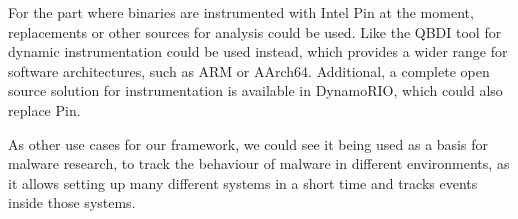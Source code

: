 For the part where binaries are instrumented with Intel Pin at the moment,
replacements or other sources for analysis could be used. Like the
QBDI\cite{qbdi} tool for dynamic instrumentation could be used instead, which
provides a wider range for software architectures, such as ARM or AArch64.
Additional, a complete open source solution for instrumentation is available in
DynamoRIO\cite{dynrio}, which could also replace Pin.

As other use cases for our framework, we could see it being used as a basis for
malware research, to track the behaviour of malware in different environments,
as it allows setting up many different systems in a short time and tracks
events inside those systems.

